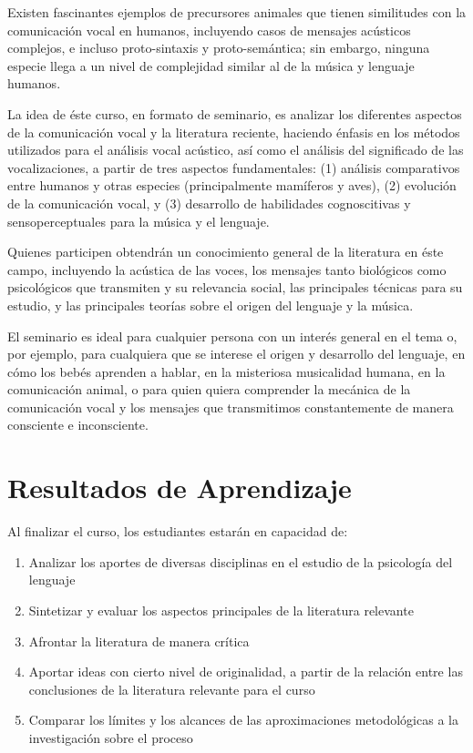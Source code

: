 \documentclass[11pt,a4paper,]{awesome-cv}
\providecommand{\tightlist}{%
	\setlength{\itemsep}{0pt}\setlength{\parskip}{0pt}}
\begin{document}
Existen fascinantes ejemplos de precursores animales que tienen
similitudes con la comunicación vocal en humanos, incluyendo casos de
mensajes acústicos complejos, e incluso proto-sintaxis y
proto-semántica; sin embargo, ninguna especie llega a un nivel de
complejidad similar al de la música y lenguaje humanos.

La idea de éste curso, en formato de seminario, es analizar los
diferentes aspectos de la comunicación vocal y la literatura reciente,
haciendo énfasis en los métodos utilizados para el análisis vocal
acústico, así como el análisis del significado de las vocalizaciones, a
partir de tres aspectos fundamentales: (1) análisis comparativos entre
humanos y otras especies (principalmente mamíferos y aves), (2)
evolución de la comunicación vocal, y (3) desarrollo de habilidades
cognoscitivas y sensoperceptuales para la música y el lenguaje.

Quienes participen obtendrán un conocimiento general de la literatura en
éste campo, incluyendo la acústica de las voces, los mensajes tanto
biológicos como psicológicos que transmiten y su relevancia social, las
principales técnicas para su estudio, y las principales teorías sobre el
origen del lenguaje y la música.

El seminario es ideal para cualquier persona con un interés general en
el tema o, por ejemplo, para cualquiera que se interese el origen y
desarrollo del lenguaje, en cómo los bebés aprenden a hablar, en la
misteriosa musicalidad humana, en la comunicación animal, o para quien
quiera comprender la mecánica de la comunicación vocal y los mensajes
que transmitimos constantemente de manera consciente e inconsciente.

\hypertarget{resultados-de-aprendizaje}{%
\section{Resultados de Aprendizaje}\label{resultados-de-aprendizaje}}

Al finalizar el curso, los estudiantes estarán en capacidad de:

\begin{enumerate}
\def\labelenumi{\arabic{enumi}.}
\tightlist
\item
  Analizar los aportes de diversas disciplinas en el estudio de la
  psicología del lenguaje
\item
  Sintetizar y evaluar los aspectos principales de la literatura
  relevante
\item
  Afrontar la literatura de manera crítica
\item
  Aportar ideas con cierto nivel de originalidad, a partir de la
  relación entre las conclusiones de la literatura relevante para el
  curso
\item
  Comparar los límites y los alcances de las aproximaciones
  metodológicas a la investigación sobre el proceso
\end{enumerate}
\end{document}
